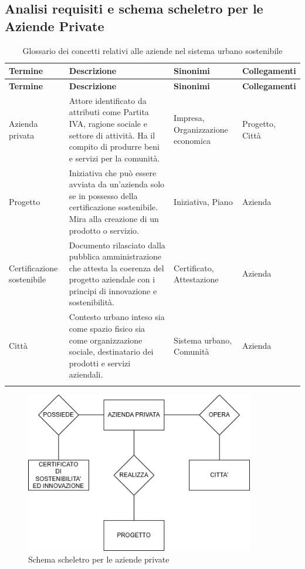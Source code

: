 \documentclass{article}
\begin{document}

\newpage
\subsection{Analisi requisiti e schema scheletro per le Aziende Private}

\begin{longtable}{|p{3cm}|p{6.5cm}|p{2.5cm}|p{3cm}|}
\hline
\textbf{Termine} & \textbf{Descrizione} & \textbf{Sinonimi} & \textbf{Collegamenti} \\
\hline
\endfirsthead

\hline
\textbf{Termine} & \textbf{Descrizione} & \textbf{Sinonimi} & \textbf{Collegamenti} \\
\hline
\endhead

Azienda privata & Attore identificato da attributi come Partita IVA, ragione sociale e settore di attività. Ha il compito di produrre beni e servizi per la comunità. & Impresa, Organizzazione economica & Progetto, Città \\
\hline

Progetto & Iniziativa che può essere avviata da un’azienda solo se in possesso della certificazione sostenibile. Mira alla creazione di un prodotto o servizio. & Iniziativa, Piano & Azienda \\
\hline

Certificazione sostenibile & Documento rilasciato dalla pubblica amministrazione che attesta la coerenza del progetto aziendale con i principi di innovazione e sostenibilità. & Certificato, Attestazione & Azienda \\
\hline

Città & Contesto urbano inteso sia come spazio fisico sia come organizzazione sociale, destinatario dei prodotti e servizi aziendali. & Sistema urbano, Comunità & Azienda \\
\hline

\caption{Glossario dei concetti relativi alle aziende nel sistema urbano sostenibile}
\label{tab:glossario-aziende}
\end{longtable}

\begin{figure}[H]
    \centering
    \includegraphics[width=10cm]{images/SCHEMA_SCHELETRO_AZIENDA.drawio.png}
    \caption{Schema scheletro per le aziende private}
    \label{fig:schema-sostenibilita}
\end{figure}

\end{document}
